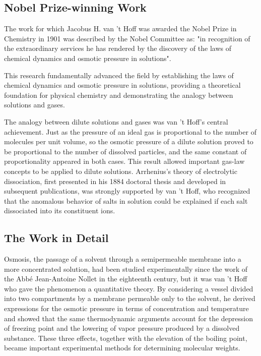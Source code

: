 \subsection*{Nobel Prize-winning Work}

The work for which Jacobus H. van 't Hoff was awarded the Nobel Prize in Chemistry in 1901 was described by the Nobel Committee as: "in recognition of the extraordinary services he has rendered by the discovery of the laws of chemical dynamics and osmotic pressure in solutions".

This research fundamentally advanced the field by establishing the laws of chemical dynamics and osmotic pressure in solutions, providing a theoretical foundation for physical chemistry and demonstrating the analogy between solutions and gases.

The analogy between dilute solutions and gases was van 't Hoff's central achievement. Just as the pressure of an ideal gas is proportional to the number of molecules per unit volume, so the osmotic pressure of a dilute solution proved to be proportional to the number of dissolved particles, and the same constant of proportionality appeared in both cases. This result allowed important gas-law concepts to be applied to dilute solutions. Arrhenius's theory of electrolytic dissociation, first presented in his 1884 doctoral thesis and developed in subsequent publications, was strongly supported by van 't Hoff, who recognized that the anomalous behavior of salts in solution could be explained if each salt dissociated into its constituent ions.

\subsection*{The Work in Detail}

Osmosis, the passage of a solvent through a semipermeable membrane into a more concentrated solution, had been studied experimentally since the work of the Abbé Jean-Antoine Nollet in the eighteenth century, but it was van 't Hoff who gave the phenomenon a quantitative theory. By considering a vessel divided into two compartments by a membrane permeable only to the solvent, he derived expressions for the osmotic pressure in terms of concentration and temperature and showed that the same thermodynamic arguments account for the depression of freezing point and the lowering of vapor pressure produced by a dissolved substance. These three effects, together with the elevation of the boiling point, became important experimental methods for determining molecular weights.

